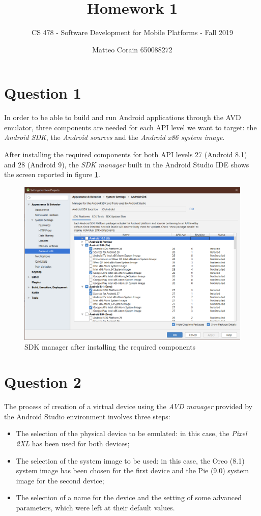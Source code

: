 \documentclass[letterpaper,headings=standardclasses]{scrartcl}
\title{Homework 1}
\subtitle{CS 478 - Software Development for Mobile Platforms - Fall 2019}
\author{Matteo Corain 650088272}
\begin{document}
\maketitle

\section{Question 1}

In order to be able to build and run Android applications through the AVD emulator, three components are needed for each API level we want to target: the \emph{Android SDK}, the \emph{Android sources} and the \emph{Android x86 system image}.

After installing the required components for both API levels 27 (Android 8.1) and 28 (Android 9), the \emph{SDK manager} built in the Android Studio IDE shows the screen reported in figure \ref{sdk_manager}.

\begin{figure}[H]
  \centering
  \includegraphics[width=.9\linewidth]{01_sdk_manager.png}
  \caption{SDK manager after installing the required components}
  \label{sdk_manager}
\end{figure}

\section{Question 2}

The process of creation of a virtual device using the \emph{AVD manager} provided by the Android Studio environment involves three steps:

\begin{itemize}

\item The selection of the physical device to be emulated: in this case, the \emph{Pixel 2XL} has been used for both devices;
\item The selection of the system image to be used: in this case, the Oreo (8.1) system image has been chosen for the first device and the Pie (9.0) system image for the second device;
\item The selection of a name for the device and the setting of some advanced parameters, which were left at their default values.

\end{itemize}
\end{document}
